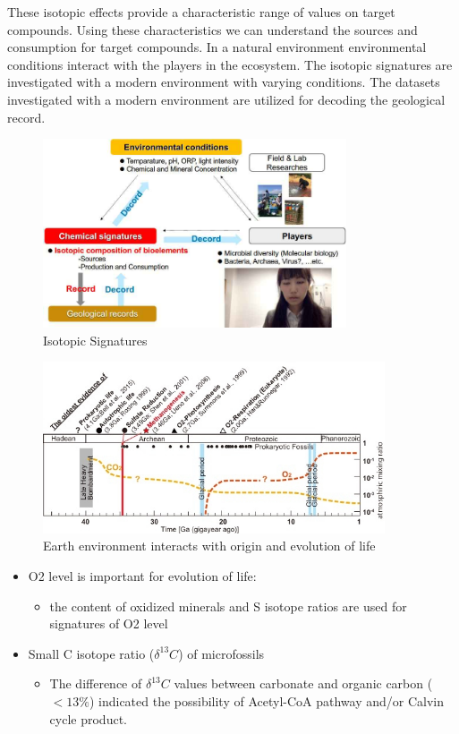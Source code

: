 \documentclass[]{article}
\begin{document}
These isotopic effects provide a characteristic range of values on target compounds. Using these characteristics we can understand the sources and consumption for target compounds. In a natural environment environmental conditions interact with the players in the ecosystem. The isotopic signatures are investigated with a modern environment with varying conditions. The datasets investigated with a modern environment are utilized for decoding the geological record.
\begin{figure}[H]
	\caption{Isotopic Signatures}
	\includegraphics[width=0.8\textwidth]{IsotopicSignatures}
\end{figure}

\begin{figure}[H]
	\caption{Earth environment interacts with origin and evolution of life}\label{fig:Timeline}
	\includegraphics[width=0.9\textwidth]{Timeline}
\end{figure}

\begin{itemize}
	\item O2 level is important for evolution of life:
	\begin{itemize}
		\item the content of oxidized minerals and S isotope ratios are used for
		signatures of O2 level
	\end{itemize}
	\item  Small C isotope ratio ($\delta^{13}C$) of microfossils
	\begin{itemize}
		\item 	The difference of $\delta^{13}C$ values between carbonate and organic carbon ($<13\%$) indicated the possibility of Acetyl-CoA pathway
		and/or Calvin cycle product.
	\end{itemize}
\end{itemize}
\end{document}
